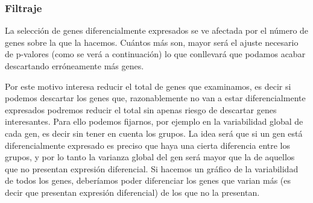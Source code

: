\documentclass[a4paper]{article}\usepackage[]{graphicx}\usepackage[]{color}
\begin{document}
\subsubsection{Filtraje}

La selección de genes diferencialmente expresados se ve afectada por el número de genes sobre la que la hacemos. Cuántos más son, mayor será el ajuste necesario de p-valores (como se verá a continuación) lo que conllevará que podamos acabar descartando erróneamente más genes.

Por este motivo interesa reducir el total de genes que examinamos, es decir si podemos descartar los genes que, razonablemente no van a estar diferencialmente expresados podremos reducir el total sin apenas riesgo de descartar genes interesantes. Para ello podemos fijarnos, por ejemplo en la variabilidad global de cada gen, es decir sin tener en cuenta los grupos. La idea será que si un gen está diferencialmente expresado es preciso que haya una cierta diferencia entre los grupos, y por lo tanto la varianza global del gen será mayor que la de aquellos que no presentan expresión diferencial. Si hacemos un gráfico de la variabilidad de todos los genes, deberíamos poder diferenciar los genes que varian más (es decir que presentan expresión diferencial) de los que no la presentan. 
\end{document}
